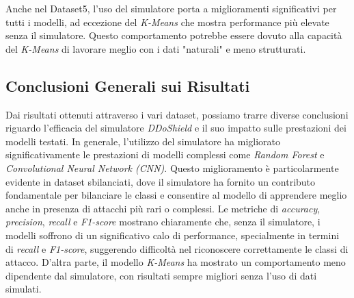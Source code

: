 \begin{table}[htbp]
\centering
\renewcommand{\arraystretch}{1.5}
\caption{Metriche di performance per Dataset5 TON\_Only}
\label{tab:performance_metrics}
\end{table}

Anche nel Dataset5, l'uso del simulatore porta a miglioramenti significativi per tutti i modelli, ad eccezione del \textit{K-Means} che mostra performance più elevate senza il simulatore. Questo comportamento potrebbe essere dovuto alla capacità del \textit{K-Means} di lavorare meglio con i dati "naturali" e meno strutturati.

\subsection{Conclusioni Generali sui Risultati}

Dai risultati ottenuti attraverso i vari dataset, possiamo trarre diverse conclusioni riguardo l'efficacia del simulatore \textit{DDoShield} e il suo impatto sulle prestazioni dei modelli testati.
In generale, l'utilizzo del simulatore ha migliorato significativamente le prestazioni di modelli complessi come \textit{Random Forest} e \textit{Convolutional Neural Network (CNN)}. Questo miglioramento è particolarmente evidente in dataset sbilanciati, dove il simulatore ha fornito un contributo fondamentale per bilanciare le classi e consentire al modello di apprendere meglio anche in presenza di attacchi più rari o complessi. Le metriche di \textit{accuracy}, \textit{precision}, \textit{recall} e \textit{F1-score} mostrano chiaramente che, senza il simulatore, i modelli soffrono di un significativo calo di performance, specialmente in termini di \textit{recall} e \textit{F1-score}, suggerendo difficoltà nel riconoscere correttamente le classi di attacco.
D'altra parte, il modello \textit{K-Means} ha mostrato un comportamento meno dipendente dal simulatore, con risultati sempre migliori senza l'uso di dati simulati.

